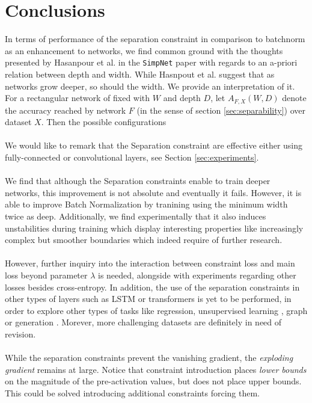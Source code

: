 \section{Conclusions}\label{sec:conclusions}
In terms of performance of the separation constraint in comparison to batchnorm as an enhancement to \ReLU networks, we find common ground with the thoughts presented by Hasanpour et al. in the \texttt{SimpNet} paper \cite{simpnet} with regards to an a-priori relation between depth and width. While Hasnpout et al. suggest that as networks grow deeper, so should the width. We provide an interpretation of it. For a rectangular network of fixed with $W$ and depth $D$, let $A_{F,X}(W,D)$ denote the accuracy reached by network $F$ (in the sense of section \ref{sec:separability}) over dataset $X$. Then the possible configurations
\\\\
We would like to remark that the Separation constraint are effective either using fully-connected or convolutional layers, see Section \ref{sec:experiments}.
\\\\
We find that although the Separation constraints enable to train deeper networks, this improvement is not absolute and eventually it fails. However, it is able to improve Batch Normalization by tranining using the minimum width twice as deep. Additionally, we find experimentally that it also induces unstabilities during training which display interesting properties like increasingly complex but smoother boundaries which indeed require of further research.
\\\\
However, further inquiry into the interaction between constraint loss and main loss beyond parameter $\lambda$ is needed, alongside with experiments regarding other losses besides cross-entropy. In addition,  the use of the separation constraints in other types of layers such as LSTM \cite{lstm} or transformers \cite{transformer}\cite{transformer2} is yet to be performed, in order to explore other types of tasks like regression, unsupervised learning \cite{embedding}, graph \cite{graph} or generation \cite{gan,vae}. Morever, more challenging datasets are definitely in need of revision.
\\\\

While the separation constraints prevent the vanishing gradient, the \emph{exploding gradient} remains at large. Notice that constraint introduction places \emph{lower bounds} on the magnitude of the pre-activation values, but does not place upper bounds. This could be solved introducing additional constraints forcing them. 





